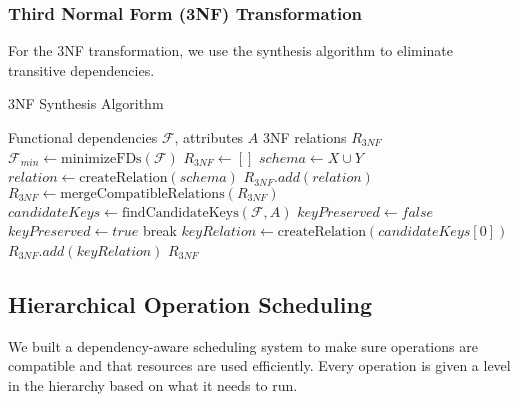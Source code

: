 \documentclass[sigconf]{acmart}
\begin{document}
\subsubsection{Third Normal Form (3NF) Transformation}

For the 3NF transformation, we use the synthesis algorithm to eliminate transitive dependencies.

\begin{algorithm}
\caption{3NF Synthesis Algorithm}
\label{alg:3nf-synthesis}
\begin{algorithmic}[1]
\REQUIRE Functional dependencies $\mathcal{F}$, attributes $A$
\ENSURE 3NF relations $R_{3NF}$
\STATE $\mathcal{F}_{min} \leftarrow \text{minimizeFDs}(\mathcal{F})$
\STATE $R_{3NF} \leftarrow []$
    \STATE $schema \leftarrow X \cup Y$
    \STATE $relation \leftarrow \text{createRelation}(schema)$
    \STATE $R_{3NF}.add(relation)$
\ENDFOR
\STATE $R_{3NF} \leftarrow \text{mergeCompatibleRelations}(R_{3NF})$
\STATE $candidateKeys \leftarrow 
\text{findCandidateKeys}(\mathcal{F}, A)$
\STATE $keyPreserved \leftarrow false$
        \STATE $keyPreserved \leftarrow true$
        \STATE break
    \ENDIF
\ENDFOR
{}
    \STATE $keyRelation \leftarrow 
    \text{createRelation}(candidateKeys[0])$
    \STATE $R_{3NF}.add(keyRelation)$
\ENDIF
\STATE \RETURN $R_{3NF}$
\end{algorithmic}
\end{algorithm}

\subsection{Hierarchical Operation Scheduling}

We built a dependency-aware scheduling system to make sure operations are compatible and that resources are used efficiently. Every operation is given a level in the hierarchy based on what it needs to run.
\end{document}
